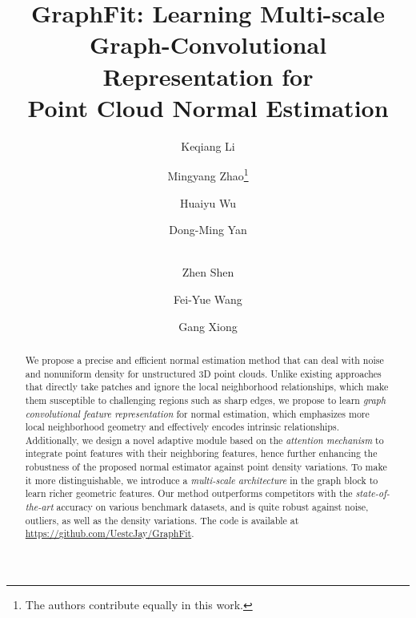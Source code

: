 \documentclass[runningheads]{llncs}
\begin{document}
\pagestyle{headings}
\mainmatter
\def\ECCVSubNumber{100}  

\title{GraphFit: Learning Multi-scale Graph-Convolutional Representation 
for \\ Point Cloud Normal Estimation} 



\begin{comment}
\titlerunning{ECCV-22 submission ID \ECCVSubNumber} 
\authorrunning{ECCV-22 submission ID \ECCVSubNumber} 
\author{Anonymous ECCV submission}
\institute{Paper ID \ECCVSubNumber}
\end{comment}


\author{Keqiang Li \and
Mingyang Zhao\thanks{The authors contribute equally in this work.} \and
Huaiyu Wu   \and
Dong-Ming Yan   \and \\
Zhen Shen   \and
Fei-Yue Wang  \and
Gang Xiong }



\maketitle
\begin{abstract}
We propose a precise and efficient normal estimation method that can deal with noise and nonuniform density for unstructured 3D point clouds. Unlike existing approaches that
directly take patches and ignore the local neighborhood relationships, which make them susceptible to challenging regions such as sharp edges, we propose to learn \emph{graph convolutional feature representation} for normal estimation, which emphasizes more local neighborhood geometry and effectively encodes intrinsic relationships. Additionally, we design a novel adaptive module based on the \emph{attention mechanism} to integrate point features with their neighboring features, hence further enhancing the robustness of the proposed normal estimator against point density variations. To make it more distinguishable, we  introduce a \emph{multi-scale architecture} in the graph block to learn richer  geometric features. Our method outperforms competitors with the \emph{state-of-the-art} accuracy on various benchmark datasets, and is quite robust against noise, outliers, as well as the density variations. The code is available at 
{\textcolor{blue}{\url{https://github.com/UestcJay/GraphFit}}}.
\end{abstract}
\end{document}

